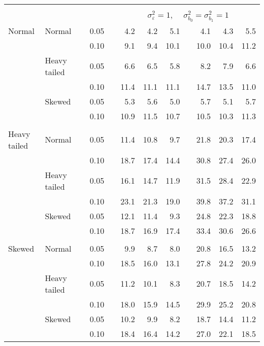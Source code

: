 \begin{table}[ht]
\begin{scriptsize}
\begin{tabular}{ll p{.1cm} c p{.1cm} rrr p{.1cm} rrr}
&&&&&&&&&&&\\
& && && \multicolumn{7}{c}{$\sigma_{\varepsilon}^2 = 1$, \ \ $\sigma_{b_0}^2 = \sigma_{b_1}^2 = 1$} \\ \cline{6-12}
\rowcolor{gray!20} Normal & Normal &  & 0.05 &  & 4.2 & 4.2 & 5.1 &  & 4.1 & 4.3 & 5.5 \\ 
\rowcolor{gray!20}    &  &  & 0.10 &  & 9.1 & 9.4 & 10.1 &  & 10.0 & 10.4 & 11.2 \\ 
\rowcolor{gray!20}    & Heavy tailed &  & 0.05 &  & 6.6 & 6.5 & 5.8 &  & 8.2 & 7.9 & 6.6 \\ 
\rowcolor{gray!20}    &  &  & 0.10 &  & 11.4 & 11.1 & 11.1 &  & 14.7 & 13.5 & 11.0 \\ 
\rowcolor{gray!20}    & Skewed &  & 0.05 &  & 5.3 & 5.6 & 5.0 &  & 5.7 & 5.1 & 5.7 \\ 
\rowcolor{gray!20}    &  &  & 0.10 &  & 10.9 & 11.5 & 10.7 &  & 10.5 & 10.3 & 11.3 \\ 
&&&&&&&&&&&\\
  Heavy tailed & Normal &  & 0.05 &  & 11.4 & 10.8 & 9.7 &  & 21.8 & 20.3 & 17.4 \\ 
  &  &  & 0.10 &  & 18.7 & 17.4 & 14.4 &  & 30.8 & 27.4 & 26.0 \\ 
  & Heavy tailed &  & 0.05 &  & 16.1 & 14.7 & 11.9 &  & 31.5 & 28.4 & 22.9 \\ 
  &  &  & 0.10 &  & 23.1 & 21.3 & 19.0 &  & 39.8 & 37.2 & 31.1 \\ 
  & Skewed &  & 0.05 &  & 12.1 & 11.4 & 9.3 &  & 24.8 & 22.3 & 18.8 \\ 
  &  &  & 0.10 &  & 18.7 & 16.9 & 17.4 &  & 33.4 & 30.6 & 26.6 \\ 
 &&&&&&&&&&&\\
  Skewed & Normal &  & 0.05 &  & 9.9 & 8.7 & 8.0 &  & 20.8 & 16.5 & 13.2 \\ 
   &  &  & 0.10 &  & 18.5 & 16.0 & 13.1 &  & 27.8 & 24.2 & 20.9 \\ 
   & Heavy tailed &  & 0.05 &  & 11.2 & 10.1 & 8.3 &  & 20.7 & 18.5 & 14.2 \\ 
   &  &  & 0.10 &  & 18.0 & 15.9 & 14.5 &  & 29.9 & 25.2 & 20.8 \\ 
   & Skewed &  & 0.05 &  & 10.2 & 9.9 & 8.2 &  & 18.7 & 14.4 & 11.2 \\ 
   &  &  & 0.10 &  & 18.4 & 16.4 & 14.2 &  & 27.0 & 22.1 & 18.5 \\ 


\end{tabular}
\end{scriptsize}
\end{table}
